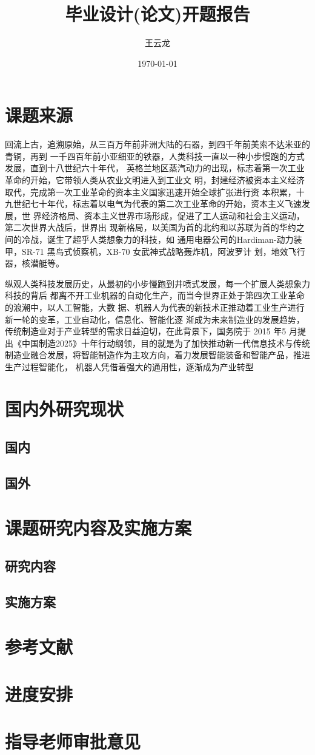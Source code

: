 \documentclass{article}
\title{\songti\zihao{3}毕业设计(论文)开题报告}
\author{王云龙}
\date{\today}
\begin{document}
	\maketitle
	\fancypage{\fbox}{}
	\section{课题来源}
	
回流上古，追溯原始，从三百万年前非洲大陆的石器，到四千年前美索不达米亚的青铜，再到
一千四百年前小亚细亚的铁器，人类科技一直以一种小步慢跑的方式发展，直到十八世纪六十年代，
英格兰地区蒸汽动力的出现，标志着第一次工业革命的开始，它带领人类从农业文明进入到工业文
明，封建经济被资本主义经济取代，完成第一次工业革命的资本主义国家迅速开始全球扩张进行资
本积累，十九世纪七十年代，标志着以电气为代表的第二次工业革命的开始，资本主义飞速发展，世
界经济格局、资本主义世界市场形成，促进了工人运动和社会主义运动，第二次世界大战后，世界出
现新格局，以美国为首的北约和以苏联为首的华约之间的冷战，诞生了超乎人类想象力的科技，如
通用电器公司的Hardiman-动力装甲，SR-71 黑鸟式侦察机，XB-70 女武神式战略轰炸机，阿波罗计
划，地效飞行器，核潜艇等。


纵观人类科技发展历史，从最初的小步慢跑到井喷式发展，每一个扩展人类想象力科技的背后
都离不开工业机器的自动化生产，而当今世界正处于第四次工业革命的浪潮中，以人工智能，大数
据、机器人为代表的新技术正推动着工业生产进行新一轮的变革，工业自动化，信息化、智能化逐
渐成为未来制造业的发展趋势，传统制造业对于产业转型的需求日益迫切，在此背景下，国务院于
2015 年5 月提出《中国制造2025》十年行动纲领，目的就是为了加快推动新一代信息技术与传统
制造业融合发展，将智能制造作为主攻方向，着力发展智能装备和智能产品，推进生产过程智能化，
机器人凭借着强大的通用性，逐渐成为产业转型

	\section{国内外研究现状}
	\subsection{国内}
	\subsection{国外}
	
	\section{课题研究内容及实施方案}
	\subsection{研究内容}
	\subsection{实施方案}
	
	\section{参考文献}
	
	\section{进度安排}
	
	\section{指导老师审批意见}
\end{document}
